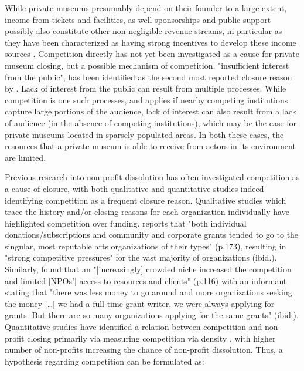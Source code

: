 \documentclass[12pt]{article}
\begin{document}
While private museums presumably depend on their founder to a large extent, income from tickets and facilities, as well sponsorships and public support possibly also constitute other non-negligible revenue streams, in particular as they have been characterized as having strong incentives to develop these income sources \parencite{Frey_Meier_2002_beyeler}.
Competition directly has not yet been investigated as a cause for private museum closing, but a possible mechanism of competition, "insufficient interest from the public", has been identified as the second most reported closure reason by \textcite[p.6]{Velthuis_Gera_2024_fragility}. 
Lack of interest from the public can result from multiple processes.
While competition is one such processes, and applies if nearby competing institutions capture large portions of the audience, lack of interest can also result from a lack of audience (in the absence of competing institutions), which may be the case for private museums located in sparsely populated areas.
In both these cases, the resources that a private museum is able to receive from actors in its environment are limited. 



Previous research into non-profit dissolution has often investigated competition as a cause of closure, with both qualitative and quantitative studies indeed identifying competition as a frequent closure reason.
Qualitative studies which trace the history and/or closing reasons for each organization individually have highlighted competition over funding.
\textcite{Hager_1999_demise} reports that "both individual donations/subscriptions and community and corporate grants tended to go to the singular, most reputable arts organizations of their types" (p.173), resulting in "strong competitive pressures" for the vast majority of organizations (ibid.).
Similarly, \textcite{HernandezOrtiz_2022_discontinuity} found that an "[increasingly] crowded niche increased the competition and limited [NPOs'] access to resources and clients" (p.116) with an informant stating that "there was less money to go around and more organizations seeking the money [\ldots{}] we had a full-time grant writer, we were always applying for grants. But there are so many organizations applying for the same grants" (ibid.).
Quantitative studies have identified a relation between competition and non-profit closing primarily via measuring competition via density \parencite{Park_Shon_Lu_2021_mortality,Haugh_etal_2021_nascent,Lu_Shon_Zhang_2019_dissolution}, with higher number of non-profits increasing the chance of non-profit dissolution.
Thus, a hypothesis regarding competition can be formulated as:
\end{document}
